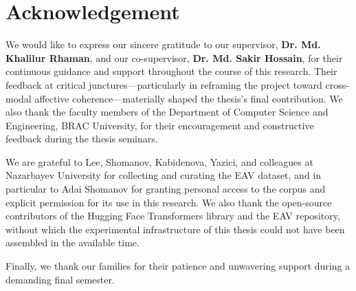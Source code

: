 \section*{Acknowledgement}

We would like to express our sincere gratitude to our supervisor, \textbf{Dr. Md. Khalilur Rhaman}, and our co-supervisor, \textbf{Dr. Md. Sakir Hossain}, for their continuous guidance and support throughout the course of this research. Their feedback at critical junctures---particularly in reframing the project toward cross-modal affective coherence---materially shaped the thesis's final contribution. We also thank the faculty members of the Department of Computer Science and Engineering, BRAC University, for their encouragement and constructive feedback during the thesis seminars.

We are grateful to Lee, Shomanov, Kabidenova, Yazici, and colleagues at Nazarbayev University for collecting and curating the EAV dataset, and in particular to Adai Shomanov for granting personal access to the corpus and explicit permission for its use in this research. We also thank the open-source contributors of the Hugging Face Transformers library and the EAV repository, without which the experimental infrastructure of this thesis could not have been assembled in the available time.

Finally, we thank our families for their patience and unwavering support during a demanding final semester.

\pagebreak
